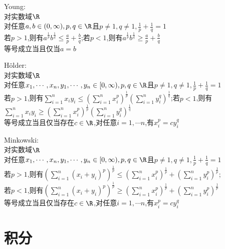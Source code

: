\begin{dingli}
Young:\\
对实数域$\R$\\
对任意$a,b\in (0,\infty),p,q\in\R$且$p\neq 1,q\neq 1,\frac{1}{p}+\frac{1}{q}=1$\\
若$p>1$,则有$a^{\frac{1}{p}}b^{\frac{1}{q}}\leq \frac{a}{p}+\frac{b}{q}$;若$p<1$,则有$a^{\frac{1}{p}}b^{\frac{1}{q}}\geq \frac{a}{p}+\frac{b}{q}$\\
等号成立当且仅当$a=b$
\end{dingli}

\begin{dingli}
Hölder:\\
对实数域$\R$\\
对任意$x_1,\cdots,x_n,y_1,\cdots,y_n\in[0,\infty),p,q\in \R$且$p\neq 1,q\neq 1,\frac{1}{p}+\frac{1}{q}=1$\\
若$p>1$,则有$\sum\limits_{i=1}^{n}x_iy_i\leq (\sum\limits_{i=1}^{n}x_i^{p})^{\frac{1}{p}}(\sum\limits_{i=1}^{n}y_i^{q})^{\frac{1}{q}}$;若$p<1$,则有$\sum\limits_{i=1}^{n}x_iy_i\geq (\sum\limits_{i=1}^{n}x_i^{p})^{\frac{1}{p}}(\sum\limits_{i=1}^{n}y_i^{q})^{\frac{1}{q}}$\\
等号成立当且仅当存在$c\in \R$,对任意$i=1,\cdots n$,有$x_{i}^{p}=cy_{i}^{q}$
\end{dingli}

\begin{dingli}
Minkowski:\\
对实数域$\R$\\
对任意$x_1,\cdots,x_n,y_1,\cdots,y_n\in[0,\infty),p,q\in \R$且$p\neq 1,q\neq 1,\frac{1}{p}+\frac{1}{q}=1$\\
若$p>1$,则有$(\sum\limits_{i=1}^{n}(x_i+y_i)^{p})^{\frac{1}{p}}\leq (\sum\limits_{i=1}^{n}x_i^{p})^{\frac{1}{p}}+(\sum\limits_{i=1}^{n}y_i^{p})^{\frac{1}{p}}$;\\
若$p<1$,则有$(\sum\limits_{i=1}^{n}(x_i+y_i)^{p})^{\frac{1}{p}}\geq (\sum\limits_{i=1}^{n}x_i^{p})^{\frac{1}{p}}+(\sum\limits_{i=1}^{n}y_i^{p})^{\frac{1}{p}}$\\
等号成立当且仅当存在$c\in \R$,对任意$i=1,\cdots n$,有$x_{i}^{p}=cy_{i}^{q}$
\end{dingli}

\chapter{积分}


